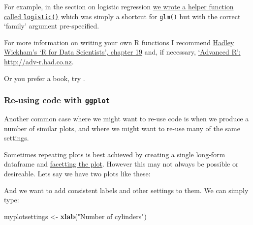 \documentclass[]{article}
\newenvironment{Shaded}{\begin{snugshade}}{\end{snugshade}}
\newcommand{\KeywordTok}[1]{\textcolor[rgb]{0.13,0.29,0.53}{\textbf{#1}}}
\newcommand{\StringTok}[1]{\textcolor[rgb]{0.31,0.60,0.02}{#1}}
\newcommand{\OperatorTok}[1]{\textcolor[rgb]{0.81,0.36,0.00}{\textbf{#1}}}
\newcommand{\NormalTok}[1]{#1}
\theoremstyle{definition}
\theoremstyle{definition}
\theoremstyle{definition}
\theoremstyle{remark}
\begin{document}
For example, in the section on logistic regression
\protect\hyperlink{helper-function-logistic}{we wrote a helper function
called \texttt{logistic()}} which was simply a shortcut for
\texttt{glm()} but with the correct `family' argument pre-specified.

For more information on writing your own R functions I recommend
\href{http://r4ds.had.co.nz/functions.html}{Hadley Wickham's `R for Data
Scientists', chapter 19} and, if necessary,
\href{http://adv-r.had.co.nz}{`Advanced R': http://adv-r.had.co.nz}.

Or you prefer a book, try \citet{grolemund2014hands}.

\hypertarget{ggplot-reuse}{\subsubsection*{\texorpdfstring{Re-using code
with \texttt{ggplot}}{Re-using code with ggplot}}\label{ggplot-reuse}}

Another common case where we might want to re-use code is when we
produce a number of similar plots, and where we might want to re-use
many of the same settings.

Sometimes repeating plots is best achieved by creating a single
long-form dataframe and \protect\hyperlink{facetting-plots}{facetting
the plot}. However this may not always be possible or desireable. Lets
say we have two plots like these:

\begin{Shaded}
\end{Shaded}

And we want to add consistent labels and other settings to them. We can
simply type:

\begin{Shaded}
\begin{Highlighting}[]
\NormalTok{myplotsettings <-}\StringTok{ }\KeywordTok{xlab}\NormalTok{(}\StringTok{"Number of cylinders"}\NormalTok{)}
\end{Highlighting}
\end{Shaded}
\end{document}
